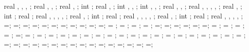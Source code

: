 {{real \foundprelenratio, \foundpostlenratio, \foundampl, \foundsegm;
real \foundspringscale, \foundspringthk, \foundsuppwidth;
real \foundsuppdepth, \foundsupplinethk;
int \foundshowsuppshade;
real \pinnedy, \aaa;
int \showleftpinsup, \showrightpinsup, \showbottompinsup;
int \nbotpin, \ibot, \ijkk;
real \botpinx, \botpinspace, \bottomlength;
real \lefttriw, \leftlinew, \leftlined, \leftlinet, \leftradratio;
real \leftxvalue, \leftyvalue;
int \leftshowcircle;
real \leftrotpin;
real \righttriw, \rightlinew, \rightlined, \rightlinet, \rightradratio;
real \rightxvalue, \rightyvalue;
int \rightshowcircle;
real \rightrotpin;
real \bottomtriw, \bottomlinew, \bottomlined, \bottomlinet, \bottomradratio;
real \bottomxvalue, \bottomyvalue;
int \bottomshowcircle;
real \bottomrotpin;
real \hsdistleft, \hsdistright, \hsdistbottom, \hsinnerlinethk, \thinlinethk;
\pframecirclerad=\pframecirclerad;
\pframelinethk=\pframelinethk;
\hsdistleft=\hsdistleft;
\hsdistright=\hsdistright;
\hsdistbottom=\hsdistbottom;
\hsinnerlinethk=\hsinnerlinethk;
\thinlinethk=\thinlinethk;
\hsdistleft=\hsdistleft;
\hsdistright=\hsdistright;
\hsdistbottom=\hsdistbottom;
\hsinnerlinethk=\hsinnerlinethk;
\storyheight = \storyheight;
\baywidth = \baywidth;
\startx = \startx;
\starty = \starty;
\doflinethickness=\doflinethickness;
\dofarrtiplen=\dofarrtiplen;
\dofarrtipwid=\dofarrtipwid;
\dofinnersepx=\dofinnersepx;
\dofinnersepy=\dofinnersepy;
\dofinnersepr=\dofinnersepr;
\supportwidth = \supportwidth;
\supportheight = \supportheight;
\isolationwidth = \isolationwidth;
\isolationdepth = \isolationdepth;
\isoshift=\isoshift;
\foundationdepth = \foundationdepth;
\linet = \linet;
\beamlinet = \beamlinet;
\collinet = \collinet;
\baselinet = \baselinet;
\isolinet = \isolinet;
\massrad = \massrad;
\foundsidew = \foundsidew;
\leftsoildist = \leftsoildist;
\rightsoildist = \rightsoildist;
\leftsoildepth = \leftsoildepth;
\rightsoildepth = \rightsoildepth;
\soilbelowfound = \soilbelowfound;
\leftcontrolx = \leftcontrolx;
\leftcontroly = \leftcontroly;
\rightcontrolx = \rightcontrolx;
\rightcontroly = \rightcontroly;
\axeslenX = \axeslenX;
\axeslenY = \axeslenY;
\piledepth=\piledepth;
\pilesidespace=\pilesidespace;
\pilediameter=\pilediameter;
\pilelinethickness=\pilelinethickness;
\pblinet=\pblinet;
\latloadshift=\latloadshift;
\toparrlen=\toparrlen;
\basearrlen=\basearrlen;
\drift=\drift;
=;
=;
=;
\engbedrockdepth=\engbedrockdepth;
\engbedrockleftdist=\engbedrockleftdist;
\engbedrockrightdist=\engbedrockrightdist;
\engbedrocklinewidth=\engbedrocklinewidth;
}}
